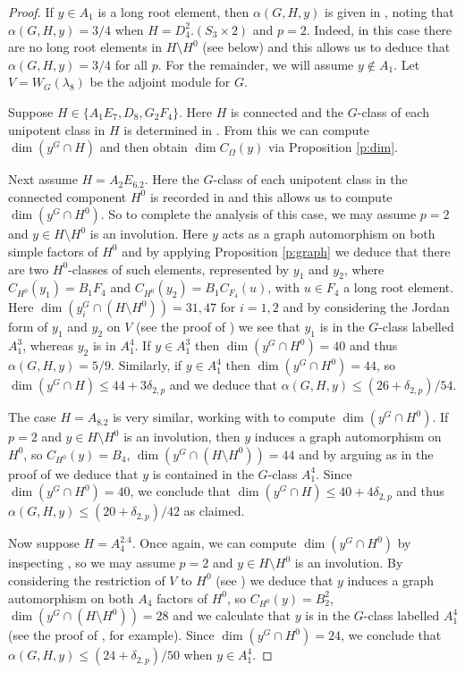 \documentclass[twoside,a4paper,reqno,11pt]{amsart}
\renewcommand{\a}{\alpha}
\renewcommand{\l}{\lambda}
\renewcommand{\O}{\Omega}
\newcommand{\<}{\langle}
\renewcommand{\>}{\rangle}
\newcommand{\leqs}{\leqslant}
\renewcommand{\:}{\colon}
\theoremstyle{plain}
\theoremstyle{definition}
\begin{document}
\begin{proof}
If $y \in A_1$ is a long root element, then $\a(G,H,y)$ is given in \cite[Table 1]{BGG1}, noting that $\a(G,H,y)=3/4$ when $H = D_4^2.(S_3 \times 2)$ and $p=2$. Indeed, in this case there are no long root elements in $H \setminus H^0$ (see below) and this allows us to deduce that $\a(G,H,y)=3/4$ for all $p$. For the remainder, we will assume $y \not\in A_1$. Let $V = W_G(\l_8)$ be the adjoint module for $G$.

Suppose $H \in \{A_1E_7, D_8, G_2F_4\}$. Here $H$ is connected and the $G$-class of each unipotent class in $H$ is determined in \cite{Law2}. From this we can  compute $\dim(y^G \cap H)$ and then obtain $\dim C_{\O}(y)$ via Proposition \ref{p:dim}.

Next assume $H = A_2E_6.2$. Here the $G$-class of each unipotent class in the connected component $H^0$ is recorded in \cite[Section 4.15]{Law2} and this allows us to compute $\dim(y^G \cap H^0)$. So to complete the analysis of this case, we may assume $p=2$ and $y \in H \setminus H^0$ is an involution. Here $y$ acts as a graph automorphism on both simple factors of $H^0$ and by applying Proposition \ref{p:graph} we deduce that  there are two $H^0$-classes of such elements, represented by $y_1$ and $y_2$, where $C_{H^0}(y_1) = B_1F_4$ and $C_{H^0}(y_2) = B_1C_{F_4}(u)$, with $u \in F_4$ a long root element. Here $\dim (y_i^G \cap (H \setminus H^0)) = 31, 47$ for $i=1,2$ and by considering the Jordan form of $y_1$ and $y_2$ on $V$ (see the proof of \cite[Lemma 3.11]{BGG1}) we see that $y_1$ is in the $G$-class labelled $A_1^3$, whereas $y_2$ is in $A_1^4$. If $y \in A_1^3$ then $\dim(y^G \cap H^0) = 40$ and thus $\a(G,H,y) = 5/9$. Similarly, if $y \in A_1^4$ then $\dim(y^G \cap H^0) = 44$, so $\dim(y^G \cap H) \leqs 44+3\delta_{2,p}$ and we deduce that $\a(G,H,y) \leqs (26+\delta_{2,p})/54$. 

The case $H = A_8.2$ is very similar, working with \cite[Section 4.16]{Law2} to compute $\dim(y^G \cap H^0)$. If $p=2$ and $y \in H \setminus H^0$ is an involution, then $y$ induces a graph automorphism on $H^0$, so $C_{H^0}(y) = B_4$, $\dim (y^G \cap (H\setminus H^0)) = 44$ and by arguing as in the proof of \cite[Proposition 5.11]{BGS} we deduce that $y$ is contained in the $G$-class $A_1^4$. Since $\dim (y^G \cap H^0) = 40$, we conclude that $\dim(y^G \cap H) \leqs 40+4\delta_{2,p}$ and thus $\a(G,H,y) \leqs (20+\delta_{2,p})/42$ as claimed. 

Now suppose $H = A_4^2.4$. Once again, we can compute $\dim (y^G \cap H^0)$ by inspecting \cite{Law2}, so we may assume $p=2$ and $y \in H \setminus H^0$ is an involution. By considering the restriction of $V$ to $H^0$ (see \cite[Table 5]{Thomas}) we deduce that $y$ induces a graph automorphism on both $A_4$ factors of $H^0$, so $C_{H^0}(y) = B_2^2$, $\dim (y^G \cap (H \setminus H^0)) = 28$ and we calculate that $y$ is in the $G$-class labelled $A_1^4$ (see the proof of \cite[Lemma 4.4]{BTh0}, for example). Since $\dim(y^G \cap H^0) = 24$, we conclude that $\a(G,H,y) \leqs (24+\delta_{2,p})/50$ when $y \in A_1^4$. 


\end{proof}
\end{document}
